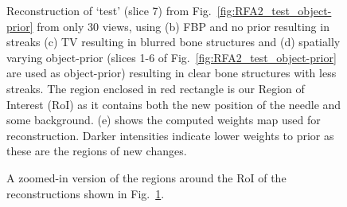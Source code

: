 \documentclass[journal]{IEEEtran}
\begin{document}
\begin{figure}[!h]
\caption{\small{ Reconstruction of `test' (slice 7) from Fig.~\ref{fig:RFA2_test_object-prior} from only 30 views, using (b) FBP and no prior resulting in streaks (c) TV resulting in blurred bone structures and (d) spatially varying object-prior (slices 1-6 of Fig.~\ref{fig:RFA2_test_object-prior} are used as object-prior) resulting in clear bone structures with less streaks. The region enclosed in red rectangle is our Region of Interest (RoI) as it contains both the new position of the needle and some background. (e) shows the computed weights map used for reconstruction. Darker intensities indicate lower weights to prior as these are the regions of new changes.}}
\label{fig:tmh_2D_results}
\end{figure}

\begin{figure}[!h]
\centering
{}\hfill
{}\hfill
{}\hfill
{}
\caption{A zoomed-in version of the regions around the RoI of the reconstructions shown in Fig.~\ref{fig:tmh_2D_results}.}
\label{fig:tmh_2D_zoomed_results}
\end{figure}
\end{document}
